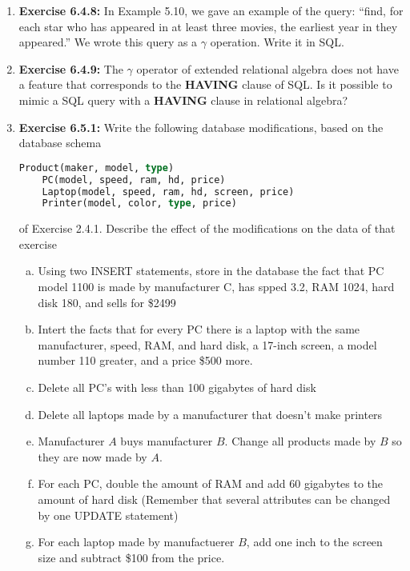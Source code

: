\documentclass[12pt]{article}
\begin{document}
\begin{enumerate}[1.]
    \item \textbf{Exercise 6.4.8:} In Example 5.10, we gave an example of the query:
    ``find, for each star who has appeared in at least three movies, the earliest year
    in they appeared.'' We wrote this query as a $\gamma$ operation. Write it in SQL.

    \item \textbf{Exercise 6.4.9:} The $\gamma$ operator of extended relational algebra
    does not have a feature that corresponds to the \textbf{HAVING} clause of SQL.
    Is it possible to mimic a SQL query with a \textbf{HAVING} clause in relational
    algebra?

    \item \textbf{Exercise 6.5.1:} Write the following database modifications, based on the
    database schema

    \begin{lstlisting}[language=SQL]
    Product(maker, model, type)
    PC(model, speed, ram, hd, price)
    Laptop(model, speed, ram, hd, screen, price)
    Printer(model, color, type, price)
    \end{lstlisting}

    \bigskip

    of Exercise 2.4.1. Describe the effect of the modifications on the data of that
    exercise

    \begin{enumerate}[a)]
        \item Using two INSERT statements, store in the database the fact that PC
        model 1100 is made by manufacturer C, has spped 3.2, RAM 1024, hard disk 180,
        and sells for \$2499
        \item Intert the facts that for every PC there is a laptop with the same
        manufacturer, speed, RAM, and hard disk, a 17-inch screen, a model number
        110 greater, and a price \$500 more.
        \item Delete all PC's with less than 100 gigabytes of hard disk
        \item Delete all laptops made by a manufacturer that doesn't make printers
        \item Manufacturer $A$ buys manufacturer $B$. Change all products made by
        $B$ so they are now made by $A$.
        \item For each PC, double the amount of RAM and add 60 gigabytes to the
        amount of hard disk (Remember that several attributes can be changed by
        one UPDATE statement)
        \item For each laptop made by manufactuerer $B$, add one inch to the screen
        size and subtract \$100 from the price.
    \end{enumerate}


\end{enumerate}
\end{document}
